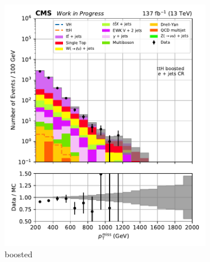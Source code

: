 \begin{figure}[htbp]
    \centering
    \begin{subfigure}[b]{0.24\textwidth}
        \includegraphics[width=\textwidth]{figures/region_plots/full_Run2/region_3/ttH_boosted.pdf}
        \caption{\ttH boosted}
    \end{subfigure}
    \hfill
    \begin{subfigure}[b]{0.24\textwidth}

\end{subfigure}
\end{figure}
